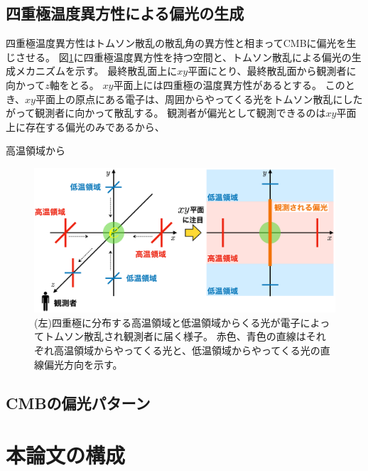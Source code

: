 \documentclass[../../main.tex]{subfiles}
\begin{document}
\subsection{四重極温度異方性による偏光の生成}
四重極温度異方性はトムソン散乱の散乱角の異方性と相まってCMBに偏光を生じさせる。
図\ref{}に四重極温度異方性を持つ空間と、トムソン散乱による偏光の生成メカニズムを示す。
最終散乱面上に$xy$平面にとり、最終散乱面から観測者に向かって$z$軸をとる。
$xy$平面上には四重極の温度異方性があるとする。
このとき、$xy$平面上の原点にある電子は、周囲からやってくる光をトムソン散乱にしたがって観測者に向かって散乱する。
観測者が偏光として観測できるのは$xy$平面上に存在する偏光のみであるから、

高温領域から
\begin{figure}[H]
    \centering
    \includegraphics[width=1.0\textwidth]{intro/thomson_polarization.pdf}
    \caption{(左)四重極に分布する高温領域と低温領域からくる光が電子によってトムソン散乱され観測者に届く様子。
    赤色、青色の直線はそれぞれ高温領域からやってくる光と、低温領域からやってくる光の直線偏光方向を示す。}
    \label{}
\end{figure}

\subsection{CMBの偏光パターン}

\section{本論文の構成}
\end{document}
